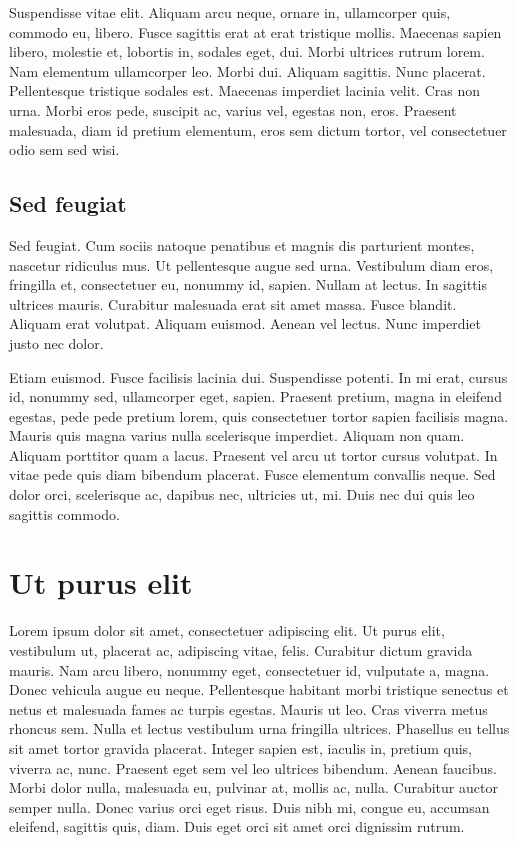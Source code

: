 Suspendisse vitae elit. Aliquam arcu neque, ornare in, ullamcorper
quis, commodo eu, libero. Fusce sagittis erat at erat tristique
mollis. Maecenas sapien libero, molestie et, lobortis in, sodales
eget, dui. Morbi ultrices rutrum lorem. Nam elementum ullamcorper
leo. Morbi dui. Aliquam sagittis. Nunc placerat. Pellentesque
tristique sodales est. Maecenas imperdiet lacinia velit. Cras non
urna. Morbi eros pede, suscipit ac, varius vel, egestas non,
eros. Praesent malesuada, diam id pretium elementum, eros sem dictum
tortor, vel consectetuer odio sem sed wisi.

\section{Sed feugiat}

Sed feugiat. Cum sociis natoque penatibus et magnis dis parturient
montes, nascetur ridiculus mus. Ut pellentesque augue sed
urna. Vestibulum diam eros, fringilla et, consectetuer eu, nonummy id,
sapien. Nullam at lectus. In sagittis ultrices mauris. Curabitur
malesuada erat sit amet massa. Fusce blandit. Aliquam erat
volutpat. Aliquam euismod. Aenean vel lectus. Nunc imperdiet justo nec
dolor.

Etiam euismod. Fusce facilisis lacinia dui. Suspendisse potenti. In mi
erat, cursus id, nonummy sed, ullamcorper eget, sapien. Praesent
pretium, magna in eleifend egestas, pede pede pretium lorem, quis
consectetuer tortor sapien facilisis magna. Mauris quis magna varius
nulla scelerisque imperdiet. Aliquam non quam. Aliquam porttitor quam
a lacus.  Praesent vel arcu ut tortor cursus volutpat. In vitae pede
quis diam bibendum placerat. Fusce elementum convallis neque. Sed
dolor orci, scelerisque ac, dapibus nec, ultricies ut, mi. Duis nec
dui quis leo sagittis commodo.




\appendix

\chapter{Ut purus elit}

Lorem ipsum dolor sit amet, consectetuer adipiscing elit. Ut purus
elit, vestibulum ut, placerat ac, adipiscing vitae, felis. Curabitur
dictum gravida mauris. Nam arcu libero, nonummy eget, consectetuer id,
vulputate a, magna. Donec vehicula augue eu neque. Pellentesque
habitant morbi tristique senectus et netus et malesuada fames ac
turpis egestas. Mauris ut leo. Cras viverra metus rhoncus sem. Nulla
et lectus vestibulum urna fringilla ultrices. Phasellus eu tellus sit
amet tortor gravida placerat. Integer sapien est, iaculis in, pretium
quis, viverra ac, nunc. Praesent eget sem vel leo ultrices
bibendum. Aenean faucibus. Morbi dolor nulla, malesuada eu, pulvinar
at, mollis ac, nulla. Curabitur auctor semper nulla.  Donec varius
orci eget risus. Duis nibh mi, congue eu, accumsan eleifend, sagittis
quis, diam. Duis eget orci sit amet orci dignissim rutrum.


